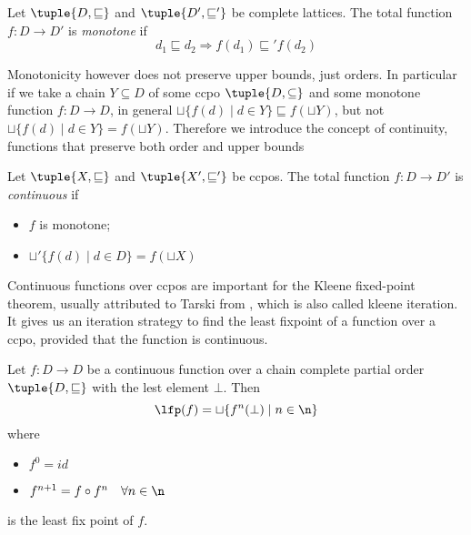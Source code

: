\begin{definition}
  Let \(\tuple{D, \sqsubseteq}\) and \(\tuple{D', \sqsubseteq'}\) be
  complete lattices. The total function \(f : D \to D'\) is
  \emph{monotone} if
  \begin{equation*}
    d_1 \sqsubseteq d_2 \Rightarrow f(d_1) \sqsubseteq' f(d_2)
  \end{equation*}
\end{definition}


Monotonicity however does not preserve upper bounds, just orders. In
particular if we take a chain \(Y \subseteq D\) of some ccpo
\(\tuple{D, \subseteq}\) and some monotone function \(f : D \to D\),
in general \(\sqcup\{f(d) \mid d \in Y\} \sqsubseteq f(\sqcup Y)\),
but not \(\sqcup\{f(d) \mid d \in Y\} = f(\sqcup Y)\). Therefore we
introduce the concept of continuity, functions that preserve both
order and upper bounds

\begin{definition}
  Let \(\tuple{X, \sqsubseteq}\) and \(\tuple{X', \sqsubseteq'}\) be
  ccpos. The total function \(f : D \to D'\) is \emph{continuous} if
  \begin{itemize}
  \item \(f\) is monotone;
  \item \(\sqcup'\{f(d) \mid d \in D\} = f(\sqcup X)\)
  \end{itemize}
\end{definition}

Continuous functions over ccpos are important for the Kleene
fixed-point theorem, usually attributed to Tarski from
\cite{tarski1955lattice}, which is also called kleene iteration. It
gives us an iteration strategy to find the least fixpoint of a
function over a ccpo, provided that the function is continuous.

\begin{theorem}\label{th:fixpoint}
  Let \(f : D \to D\) be a continuous function over a chain complete
  partial order \(\tuple{D , \sqsubseteq}\) with the lest element
  \(\bot\). Then
  \begin{equation*}
    \lfp(f) = \sqcup\{f^n(\bot) \mid n \in \n\}
  \end{equation*}
  where
  \begin{itemize}
  \item \(f^0 = id\)
  \item \(f^{n+1} = f \circ f^n \quad \forall n \in \n\)
  \end{itemize}
  is the least fix point of \(f\).
\end{theorem}